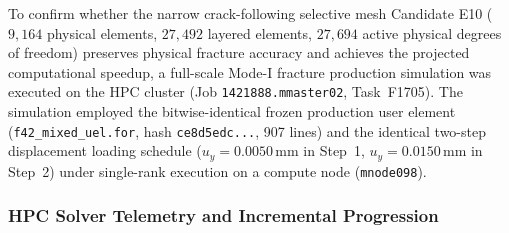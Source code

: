 To confirm whether the narrow crack-following selective mesh Candidate E10 ($9{,}164$ physical elements, $27{,}492$ layered elements, $27{,}694$ active physical degrees of freedom) preserves physical fracture accuracy and achieves the projected computational speedup, a full-scale Mode-I fracture production simulation was executed on the HPC cluster (Job \texttt{1421888.mmaster02}, Task~F1705). The simulation employed the bitwise-identical frozen production user element (\texttt{f42\_mixed\_uel.for}, hash \texttt{ce8d5edc...}, 907 lines) and the identical two-step displacement loading schedule ($u_y = 0.0050\,\mathrm{mm}$ in Step~1, $u_y = 0.0150\,\mathrm{mm}$ in Step~2) under single-rank execution on a compute node (\texttt{mnode098}).

\subsubsection{HPC Solver Telemetry and Incremental Progression}
\label{subsubsec:f1705_telemetry}

